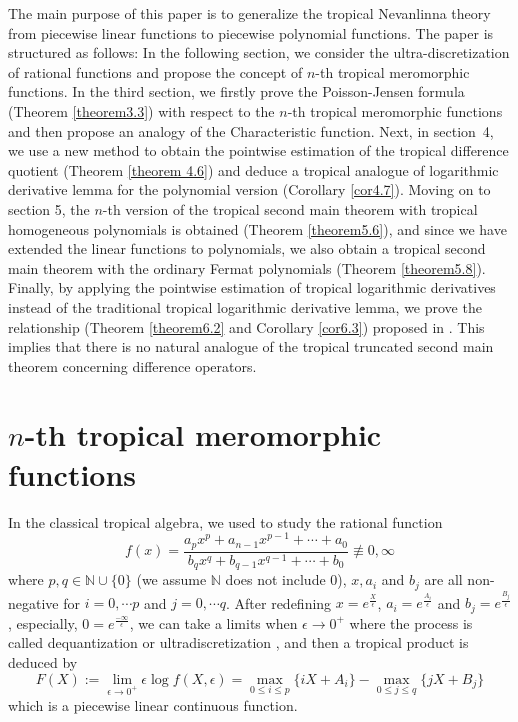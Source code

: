 \documentclass{article}
\begin{document}
The main purpose of this paper is to generalize the tropical Nevanlinna theory from piecewise linear functions to piecewise polynomial functions. The paper is structured as follows: In the following section, we consider the ultra-discretization of rational functions and propose the concept of $n$-th tropical meromorphic functions. In the third section, we firstly prove the Poisson-Jensen formula (Theorem \ref{theorem3.3}) with respect to the $n$-th tropical meromorphic functions and then propose an analogy of the Characteristic function. Next, in section~4, we use a new method to obtain the pointwise estimation of the tropical difference quotient (Theorem \ref{theorem 4.6}) and deduce a tropical analogue of logarithmic derivative lemma for the polynomial version (Corollary \ref{cor4.7}). Moving on to section 5, the $n$-th version of the tropical second main theorem with tropical homogeneous polynomials is obtained (Theorem \ref{theorem5.6}), and since we have extended the linear functions to polynomials, we also obtain a tropical second main theorem with the ordinary Fermat polynomials (Theorem \ref{theorem5.8}). Finally, by applying the pointwise estimation of tropical logarithmic derivatives instead of the traditional tropical logarithmic derivative lemma, we prove the relationship (Theorem \ref{theorem6.2} and Corollary \ref{cor6.3}) proposed in \cite{Pro}. This implies that there is no natural analogue of the tropical truncated second main theorem concerning difference operators.


\section{$n$-th tropical meromorphic functions}
In the classical tropical algebra, we used to study the rational function
\begin{equation*}
    f(x)=\frac{a_{p}x^{p}+a_{n-1}x^{p-1}+\cdots+a_{0}}{b_{q}x^{q}+b_{q-1}x^{q-1}+\cdots+b_{0}}\not\equiv 0, \infty
\end{equation*}
where $p, q\in\mathbb{N}\cup\{0\}$ (we assume $\mathbb{N}$ does not include $0$), $x, a_{i}$ and $b_{j}$ are all non-negative for $i=0, \cdots p$ and $j=0, \cdots q$. After redefining $x=e^{\frac{X}{\epsilon}}$, $a_{i}=e^{\frac{A_{i}}{\epsilon}}$ and $b_{j}=e^{\frac{B_{j}}{\epsilon}}$, especially, $0=e^{\frac{-\infty}{\epsilon}}$, we can take a limits when $\epsilon\rightarrow 0^{+}$ where the process is called dequantization \cite{Upa, Cel} or ultradiscretization \cite{Tnt}, and then a tropical product is deduced by
\begin{equation*}
    F(X):=\lim\limits_{\epsilon\rightarrow 0^{+}}\epsilon\log f(X, \epsilon)=\max\limits_{0\leq i\leq p}\{iX+A_{i}\}-\max\limits_{0\leq j\leq q}\{jX+B_{j}\}
\end{equation*}
which is a piecewise linear continuous function.
\end{document}

